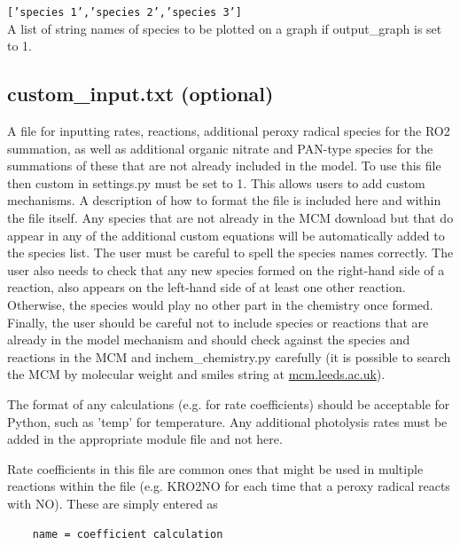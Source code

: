 \documentclass[a4paper]{refart}
\begin{document}
\texttt{['species 1','species 2','species 3']}\\
A list of string names of species to be plotted on a graph if output\_graph is set to 1.

\subsection{custom\_input.txt (optional)}\label{custom_input.txt}
A file for inputting rates, reactions, additional peroxy radical species for the RO2 summation, as well as additional organic nitrate and PAN-type species for the summations of these that are not already included in the model. To use this file then custom in settings.py must be set to 1. This allows users to add custom mechanisms. A description of how to format the file is included here and within the file itself. Any species that are not already in the MCM download but that do appear in any of the additional custom equations will be automatically added to the species list. The user must be careful to spell the species names correctly. The user also needs to check that any new species formed on the right-hand side of a reaction, also appears on the left-hand side of at least one other reaction. Otherwise, the species would play no other part in the chemistry once formed. Finally, the user should be careful not to include species or reactions that are already in the model mechanism and should check against the species and reactions in the MCM and inchem\_chemistry.py carefully (it is possible to search the MCM by molecular weight and smiles string at \url{mcm.leeds.ac.uk}).

The format of any calculations (e.g. for rate coefficients) should be acceptable for Python, such as 'temp' for temperature. Any additional photolysis rates must be added in the appropriate module file and not here.

Rate coefficients in this file are common ones that might be used in multiple reactions within the file (e.g. KRO2NO for each time that a peroxy radical reacts with NO). These are simply entered as
\begin{verbatim}
    name = coefficient calculation
\end{verbatim}
\end{document}
